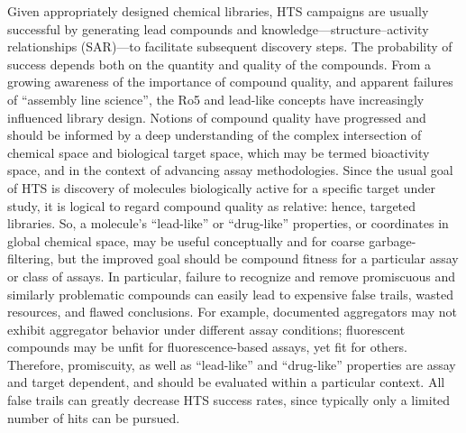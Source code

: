 Given appropriately designed chemical libraries\cite{Olah2004-rl}, HTS campaigns are usually successful by generating lead compounds and knowledge—structure–activity relationships (SAR)—to facilitate subsequent discovery steps. The probability of success depends both on the quantity and quality of the compounds. From a growing awareness of the importance of compound quality, and apparent failures of “assembly line science”, the Ro5 and lead-like concepts have increasingly influenced library design. Notions of compound quality have progressed and should be informed by a deep understanding of the complex intersection of chemical space and biological target space, which may be termed bioactivity space, and in the context of advancing assay methodologies. Since the usual goal of HTS is discovery of molecules biologically active for a specific target under study, it is logical to regard compound quality as relative: hence, targeted libraries. So, a molecule’s “lead-like” or “drug-like” properties, or coordinates in global chemical space, may be useful conceptually and for coarse garbage-filtering, but the improved goal should be compound fitness for a particular assay or class of assays. In particular, failure to recognize and remove promiscuous and similarly problematic compounds can easily lead to expensive false trails, wasted resources, and flawed conclusions. For example, documented aggregators may not exhibit aggregator behavior under different assay conditions; fluorescent compounds may be unfit for fluorescence-based assays, yet fit for others. Therefore, promiscuity, as well as “lead-like” and “drug-like” properties are assay and target dependent, and should be evaluated within a particular context. All false trails can greatly decrease HTS success rates, since typically only a limited number of hits can be pursued.

